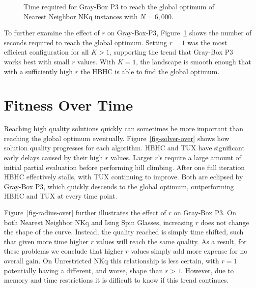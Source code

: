 \begin{figure}
  \centering
  \caption{Time required for Gray-Box P3 to reach the global optimum of Nearest Neighbor NKq instances with $N=6,000$.}
  \label{fig-p3-seconds}
\end{figure}

To further examine the effect of $r$ on Gray-Box-P3, Figure~\ref{fig-p3-seconds} shows the number of
seconds required to reach the global optimum. Setting $r=1$ was the most efficient configuration for all $K > 1$,
supporting the trend that Gray-Box P3 works best with small $r$ values. With $K=1$, the landscape is smooth enough
that with a sufficiently high $r$ the HBHC is able to find the global optimum.

\section{Fitness Over Time}
\label{sec-over-time}
\begin{figure*}
  \centering
  \caption{Comparison of solution quality during optimization on a log-log scale for different algorithms. For NKq-Landscapes $N=6,000$ and $K=4$ and
  for Ising Spin Glasses $N=6,084$. Each algorithm uses its best found $r$ value.}
  \label{fig-solver-over}
\end{figure*}

Reaching high quality solutions quickly can sometimes be more important than reaching the global optimum
eventually. Figure~\ref{fig-solver-over} shows how solution quality
progresses 
for each algorithm. HBHC and TUX have significant early delays caused by their high $r$ values. Larger
$r$'s require a large amount of initial partial evaluation before performing hill climbing. After one full iteration
HBHC effectively stalls, with TUX continuing to improve. Both are eclipsed by Gray-Box P3,
which quickly descends to the global optimum, outperforming HBHC and TUX at every time point.

Figure~\ref{fig-radius-over} further illustrates the effect of $r$ on
Gray-Box P3. On 
both
Nearest Neighbor NKq
and Ising Spin Glasses, increasing $r$ does not change the shape of
the curve. Instead,
the quality reached is simply time shifted,
such that given more time higher $r$ values will reach the same quality. As a result, for these problems we conclude
that higher $r$ values simply add more expense for no overall gain.
On Unrestricted NKq this relationship is less certain, with $r=1$ potentially having a different, and worse, shape than $r>1$.
However, due to memory and time restrictions it is difficult to know if this trend continues.

